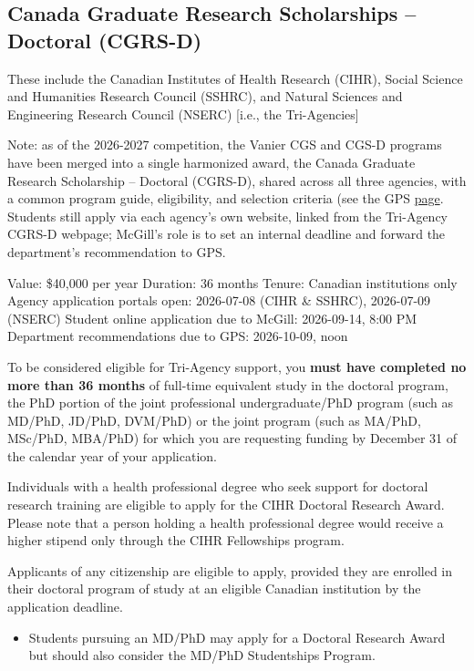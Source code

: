 \documentclass[
  letterpaper,
  DIV=11,
  numbers=noendperiod]{scrreprt}
\providecommand{\tightlist}{%
  \setlength{\itemsep}{0pt}\setlength{\parskip}{0pt}}
\begin{document}
\subsection{Canada Graduate Research Scholarships -- Doctoral
(CGRS-D)}\label{canada-graduate-research-scholarships-doctoral-cgrs-d}

These include the Canadian Institutes of Health Research (CIHR), Social
Science and Humanities Research Council (SSHRC), and Natural Sciences
and Engineering Research Council (NSERC) {[}i.e., the Tri-Agencies{]}

Note: as of the 2026-2027 competition, the Vanier CGS and CGS-D programs
have been merged into a single harmonized award, the Canada Graduate
Research Scholarship -- Doctoral (CGRS-D), shared across all three
agencies, with a common program guide, eligibility, and selection
criteria (see the GPS
\href{https://www.mcgill.ca/gps/funding/fac-staff/awards/tri-agency-cgrs-d-cihr-nserc-sshrc}{page}.
Students still apply via each agency's own website, linked from the
Tri-Agency CGRS-D webpage; McGill's role is to set an internal deadline
and forward the department's recommendation to GPS.

Value: \$40,000 per year Duration: 36 months Tenure: Canadian
institutions only Agency application portals open: 2026-07-08 (CIHR \&
SSHRC), 2026-07-09 (NSERC) Student online application due to McGill:
2026-09-14, 8:00 PM Department recommendations due to GPS: 2026-10-09,
noon

To be considered eligible for Tri-Agency support, you \textbf{must have
completed no more than 36 months} of full-time equivalent study in the
doctoral program, the PhD portion of the joint professional
undergraduate/PhD program (such as MD/PhD, JD/PhD, DVM/PhD) or the joint
program (such as MA/PhD, MSc/PhD, MBA/PhD) for which you are requesting
funding by December 31 of the calendar year of your application.

Individuals with a health professional degree who seek support for
doctoral research training are eligible to apply for the CIHR Doctoral
Research Award. Please note that a person holding a health professional
degree would receive a higher stipend only through the CIHR Fellowships
program.

Applicants of any citizenship are eligible to apply, provided they are
enrolled in their doctoral program of study at an eligible Canadian
institution by the application deadline.

\begin{itemize}
\tightlist
\item
  Students pursuing an MD/PhD may apply for a Doctoral Research Award
  but should also consider the MD/PhD Studentships Program.
\end{itemize}
\end{document}
